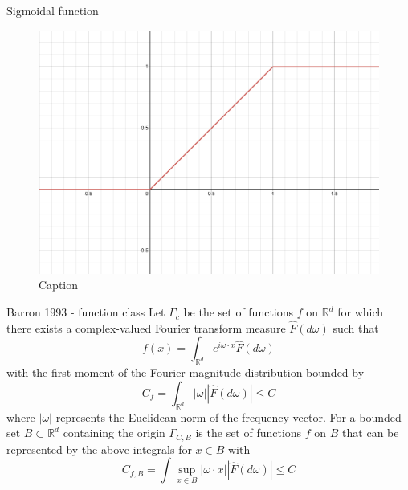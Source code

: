 \documentclass[aspectratio=169]{beamer} %
\begin{document}
\begin{frame}{Sigmoidal function}
    \begin{figure}
        \centering
        \includegraphics[width=0.9\linewidth]{Reinforcement Learning/Curse of Dimensionality/relusig.png}
        \caption{Caption}
        \label{fig:enter-label}
    \end{figure}
\end{frame}

\begin{frame}{Barron 1993 - function class}
Let $\Gamma_c$ be the set of functions $f$ on $\mathbb{R}^d$ for which there exists a complex-valued Fourier transform measure $\hat F(d\omega)$ such that
$$
f(x) = \int_{\mathbb{R}^d} e^{i\omega\cdot x} \hat F(d\omega)
$$
with the first moment of the Fourier magnitude distribution bounded by
$$
C_f = \int_{\mathbb{R}^d} |\omega||\hat F(d\omega)| \le C
$$
where $|\omega|$ represents the Euclidean norm of the frequency vector.
For a bounded set $B\subset\mathbb{R}^d$ containing the origin $\Gamma_{C,B}$ is the set of functions $f$ on $B$ that can be represented by the above integrals for $x\in B$ with
$$
C_{f,B} = \int \sup_{x\in B} |\omega \cdot x| |\hat F(d\omega)|\le C
$$
    
\end{frame}
\end{document}
